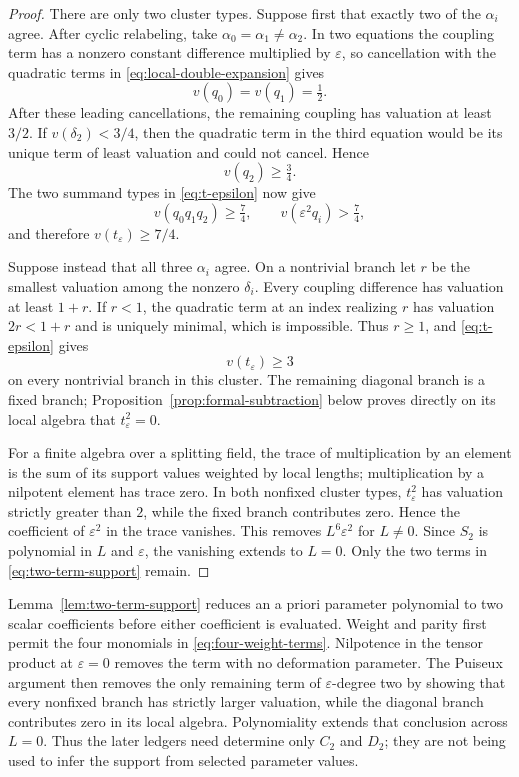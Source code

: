 \documentclass[11pt]{article}
\theoremstyle{definition}
\begin{document}
{\begin{proof}
There are only two cluster types. Suppose first that exactly two of the $\alpha_i$ agree. After cyclic relabeling, take $\alpha_0=\alpha_1\ne\alpha_2$. In two equations the coupling term has a nonzero constant difference multiplied by $\varepsilon$, so cancellation with the quadratic terms in \eqref{eq:local-double-expansion} gives
\[
v(q_0)=v(q_1)=\tfrac12.
\]
After these leading cancellations, the remaining coupling has valuation at least $3/2$. If $v(\delta_2)<3/4$, then the quadratic term in the third equation would be its unique term of least valuation and could not cancel. Hence
\[
v(q_2)\ge\tfrac34.
\]
The two summand types in \eqref{eq:t-epsilon} now give
\[
v(q_0q_1q_2)\ge\tfrac74,
\qquad
v(\varepsilon^2q_i)>\tfrac74,
\]
and therefore $v(t_\varepsilon)\ge7/4$.

Suppose instead that all three $\alpha_i$ agree. On a nontrivial branch let $r$ be the smallest valuation among the nonzero $\delta_i$. Every coupling difference has valuation at least $1+r$. If $r<1$, the quadratic term at an index realizing $r$ has valuation $2r<1+r$ and is uniquely minimal, which is impossible. Thus $r\ge1$, and \eqref{eq:t-epsilon} gives
\[
v(t_\varepsilon)\ge3
\]
on every nontrivial branch in this cluster. The remaining diagonal branch is a fixed branch; Proposition~\ref{prop:formal-subtraction} below proves directly on its local algebra that $t_\varepsilon^2=0$.

For a finite algebra over a splitting field, the trace of multiplication by an element is the sum of its support values weighted by local lengths; multiplication by a nilpotent element has trace zero. In both nonfixed cluster types, $t_\varepsilon^2$ has valuation strictly greater than $2$, while the fixed branch contributes zero. Hence the coefficient of $\varepsilon^2$ in the trace vanishes. This removes $L^6\varepsilon^2$ for $L\ne0$. Since $S_2$ is polynomial in $L$ and $\varepsilon$, the vanishing extends to $L=0$. Only the two terms in \eqref{eq:two-term-support} remain.
\end{proof}

Lemma~\ref{lem:two-term-support} reduces an a priori parameter polynomial to two scalar coefficients before either coefficient is evaluated. Weight and parity first permit the four monomials in \eqref{eq:four-weight-terms}. Nilpotence in the tensor product at $\varepsilon=0$ removes the term with no deformation parameter. The Puiseux argument then removes the only remaining term of $\varepsilon$-degree two by showing that every nonfixed branch has strictly larger valuation, while the diagonal branch contributes zero in its local algebra. Polynomiality extends that conclusion across $L=0$. Thus the later ledgers need determine only $C_2$ and $D_2$; they are not being used to infer the support from selected parameter values.

}
\end{document}
